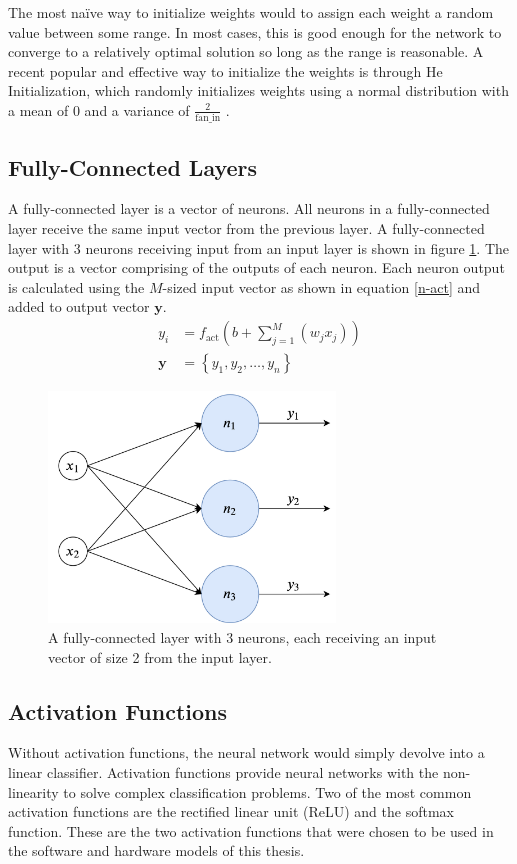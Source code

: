 The most na\"ive way to initialize weights would to assign each weight a random value between some range. In most cases, this is good enough for the network to converge to a relatively optimal solution so long as the range is reasonable. A recent popular and effective way to initialize the weights is through He Initialization, which randomly initializes weights using a normal distribution with a mean of 0 and a variance of $\frac{2}{\text{fan\_in}}$ \cite{HeZR015}. 


\subsection{Fully-Connected Layers}
A fully-connected layer is a vector of neurons. All neurons in a fully-connected layer receive the same input vector from the previous layer. A fully-connected layer with 3 neurons receiving input from an input layer is shown in figure \ref{fully-connected}. The output is a vector comprising of the outputs of each neuron. Each neuron output is calculated using the $M$-sized input vector as shown in equation \ref{n-act} and added to output vector $\mathbf{y}$.
\begin{align}
y_i &= f_{\text{act}}\left( b + \sum_{j=1}^{M}(w_jx_j) \right) \label{n-act} \\
\mathbf{y} &= \left\{ y_1, y_2, \ldots, y_n \right\} 
\end{align}

\begin{figure}
	\centering
	\includegraphics[width=3in]{figures/fully-connected}
	\caption{A fully-connected layer with 3 neurons, each receiving an input vector of size 2 from the input layer.}\label{fully-connected}
\end{figure}

\subsection{Activation Functions}
Without activation functions, the neural network would simply devolve into a linear classifier. Activation functions provide neural networks with the non-linearity to solve complex classification problems. Two of the most common activation functions are the rectified linear unit (ReLU) and the softmax function. These are the two activation functions that were chosen to be used in the software and hardware models of this thesis.

